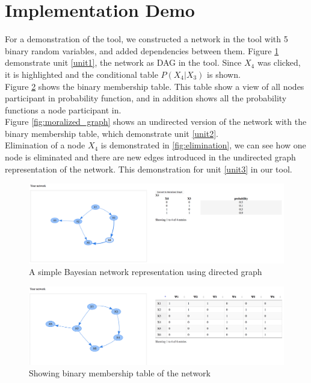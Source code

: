 \documentclass{article}
\begin{document}
    \section{Implementation Demo}\label{sec:demo}
    For a demonstration of the tool, we constructed a network in the tool with 5 binary random variables, and added dependencies between them. Figure \ref{fig:besian_network}  demonstrate unit \ref{unit1}, the network as DAG in the tool. Since $X_4$ was clicked, it is highlighted and the conditional table $P(X_4|X_3)$ is shown.\\
    Figure \ref{fig:binary_membership} shows the binary membership table. This table show a view of all nodes participant in probability function, and in addition shows all the probability functions a node participant in.\\
    Figure \ref{fig:moralized_graph} shows an undirected version of the network with the binary membership table, which demonstrate unit \ref{unit2}.\\
    Elimination of a node $X_4$ is demonstrated in \ref{fig:elimination}, we can see how one node is eliminated and there are new edges introduced in the undirected graph representation of the network. This demonstration for unit \ref{unit3} in our tool.
    \begin{figure}[h!]
        \includegraphics[width=\textwidth]{img/network_one_highlighted.png}
        \centering
        \caption{A simple Bayesian network representation using directed graph}
        \label{fig:besian_network}
    \end{figure}

    \begin{figure}[h!]
        \includegraphics[width=\linewidth]{img/network_binary_matrix.png}
        \caption{Showing binary membership table of the network}
        \label{fig:binary_membership}
    \end{figure}
\end{document}
